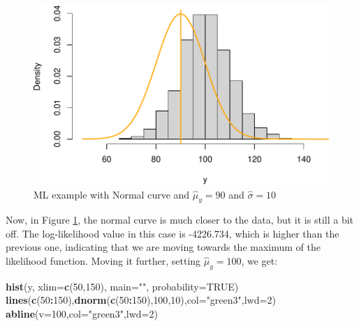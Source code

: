 \documentclass[
]{book}
\newenvironment{Shaded}{\begin{snugshade}}{\end{snugshade}}
\newcommand{\DataTypeTok}[1]{\textcolor[rgb]{0.13,0.29,0.53}{#1}}
\newcommand{\DecValTok}[1]{\textcolor[rgb]{0.00,0.00,0.81}{#1}}
\newcommand{\KeywordTok}[1]{\textcolor[rgb]{0.13,0.29,0.53}{\textbf{#1}}}
\newcommand{\NormalTok}[1]{#1}
\newcommand{\OperatorTok}[1]{\textcolor[rgb]{0.81,0.36,0.00}{\textbf{#1}}}
\newcommand{\OtherTok}[1]{\textcolor[rgb]{0.56,0.35,0.01}{#1}}
\newcommand{\StringTok}[1]{\textcolor[rgb]{0.31,0.60,0.02}{#1}}
\theoremstyle{definition}
\theoremstyle{definition}
\theoremstyle{definition}
\theoremstyle{definition}
\theoremstyle{remark}
\begin{document}
\begin{figure}
\centering
\includegraphics{Svetunkov---Statistics-for-Business-Analytics_files/figure-latex/MLENormalExample02-1.pdf}
\caption{\label{fig:MLENormalExample02}ML example with Normal curve and \(\hat{\mu}_y=90\) and \(\hat{\sigma}=10\)}
\end{figure}

Now, in Figure \ref{fig:MLENormalExample02}, the normal curve is much closer to the data, but it is still a bit off. The log-likelihood value in this case is -4226.734, which is higher than the previous one, indicating that we are moving towards the maximum of the likelihood function. Moving it further, setting \(\hat{\mu}_y=100\), we get:

\begin{Shaded}
\begin{Highlighting}[]
\KeywordTok{hist}\NormalTok{(y, }\DataTypeTok{xlim=}\KeywordTok{c}\NormalTok{(}\DecValTok{50}\NormalTok{,}\DecValTok{150}\NormalTok{), }\DataTypeTok{main=}\StringTok{""}\NormalTok{, }\DataTypeTok{probability=}\OtherTok{TRUE}\NormalTok{)}
\KeywordTok{lines}\NormalTok{(}\KeywordTok{c}\NormalTok{(}\DecValTok{50}\OperatorTok{:}\DecValTok{150}\NormalTok{),}\KeywordTok{dnorm}\NormalTok{(}\KeywordTok{c}\NormalTok{(}\DecValTok{50}\OperatorTok{:}\DecValTok{150}\NormalTok{),}\DecValTok{100}\NormalTok{,}\DecValTok{10}\NormalTok{),}\DataTypeTok{col=}\StringTok{"green3"}\NormalTok{,}\DataTypeTok{lwd=}\DecValTok{2}\NormalTok{)}
\KeywordTok{abline}\NormalTok{(}\DataTypeTok{v=}\DecValTok{100}\NormalTok{,}\DataTypeTok{col=}\StringTok{"green3"}\NormalTok{,}\DataTypeTok{lwd=}\DecValTok{2}\NormalTok{)}
\end{Highlighting}
\end{Shaded}
\end{document}
